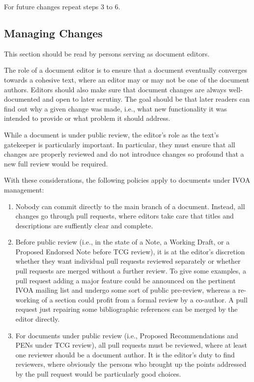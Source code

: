\documentclass[11pt,a4paper]{ivoa}
\begin{document}
For future changes repeat steps 3 to 6.

\subsection{Managing Changes}

This section should be read by persons serving as document editors.

The role of a document editor is to ensure that a document eventually
converges towards a cohesive text, where an editor may or may not be one
of the document authors.  Editors should also make sure that
document changes are always well-documented and open to later scrutiny.
The goal should be that later readers can find out why a given change
was made, i.e., what new functionality it was intended to provide or
what problem it should address.

While a document is under public review, the editor's role as the text's
gatekeeper is particularly important.  In particular, they must ensure
that all changes are properly reviewed and do not introduce changes so
profound that a new full review would be required.

With these considerations, the following policies apply to documents
under IVOA management:

\begin{enumerate}
\renewcommand\theenumi{\alph{enumi}}
\item Nobody can commit directly to the main branch of a document.
Instead, all changes go through pull requests, where editors take care
that titles and descriptions are suffiently clear and complete.

\item Before public review (i.e., in the state of a Note, a Working
Draft, or a Proposed Endorsed Note before TCG review), it is at the
editor's discretion whether they want individual pull requests reviewed
separately or whether pull requests are merged without a further review.
To give some examples, a pull request adding a major feature could be
announced on the pertinent IVOA mailing list and undergo some sort of
public pre-review, whereas a re-working of a section could profit from a
formal review by a co-author.  A pull request just repairing some
bibliographic references can be merged by the editor directly.

\item For documents under public review (i.e., Proposed Recommendations
and PENs under TCG review), all pull requests must be reviewed, where at
least one reviewer should be a document author.  It is the editor's duty
to find reviewers, where obviously the persons who brought up the points
addressed by the pull request would be particularly good choices.
\end{enumerate}
\end{document}
